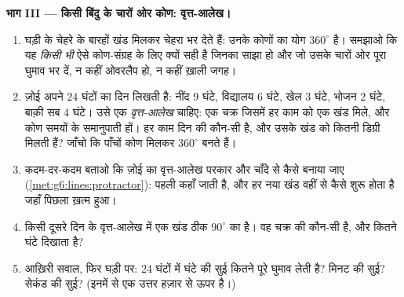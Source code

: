 \begin{problem}[{सप्ताहांत समस्या --- कोण घुमाव की भिन्नों के
रूप में: उन्हें घड़ी पर पढ़ना, वे क्षण खोजना जब सुइयाँ मिलती
हैं, और एक दिन को वृत्त-आलेख में काटना}]
\medskip
\noindent\textbf{भाग III --- किसी बिंदु के चारों ओर कोण:
वृत्त-आलेख।}
\begin{enumerate}[resume]
  \item घड़ी के चेहरे के बारहों खंड मिलकर चेहरा भर देते हैं:
        उनके कोणों का योग $360^\circ$ है। समझाओ कि यह
        \emph{किसी भी} ऐसे कोण-संग्रह के लिए क्यों सही है जिनका
         साझा हो और जो उसके चारों ओर पूरा घुमाव भर दें, न
        कहीं ओवरलैप हो, न कहीं ख़ाली जगह।
  \item ज़ोई अपने $24$ घंटों का दिन लिखती है: नींद $9$ घंटे,
        विद्यालय $6$ घंटे, खेल $3$ घंटे, भोजन $2$ घंटे, बाक़ी सब
        $4$ घंटे। उसे एक \emph{वृत्त-आलेख} चाहिए: एक चक्र जिसमें
        हर काम को एक खंड मिले, और कोण समयों के समानुपाती हों।
        हर काम दिन की कौन-सी  है, और उसके खंड को कितनी
        डिग्री मिलती हैं? जाँचो कि पाँचों कोण मिलकर $360^\circ$
        बनते हैं।
  \item कदम-दर-कदम बताओ कि ज़ोई का वृत्त-आलेख परकार और चाँदे से
        कैसे बनाया जाए (\cref{met:g6:lines:protractor}): पहली
         कहाँ जाती है, और हर नया खंड वहीं से कैसे शुरू
        होता है जहाँ पिछला ख़त्म हुआ।
  \item किसी दूसरे दिन के वृत्त-आलेख में एक खंड ठीक $90^\circ$
        का है। वह चक्र की कौन-सी  है, और कितने घंटे दिखाता
        है?
  \item आख़िरी सवाल, फिर घड़ी पर: $24$ घंटों में घंटे की सुई
        कितने पूरे घुमाव लेती है? मिनट की सुई? सेकंड की सुई?
        (इनमें से एक उत्तर हज़ार से ऊपर है।)
\end{enumerate}
\end{problem}
